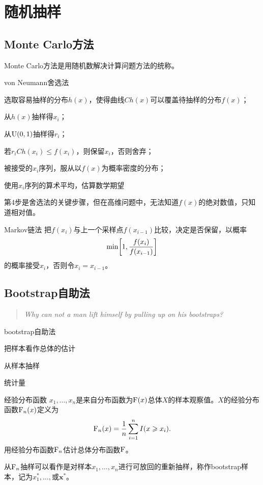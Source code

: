 \chapter{随机抽样}
\section{Monte Carlo方法}
Monte Carlo方法是用随机数解决计算问题方法的统称。
\begin{theorem}{von Neumann舍选法}{}
	\begin{compactenum}
		\item 选取容易抽样的分布$h(x)$，使得曲线$Ch(x)$可以覆盖待抽样的分布$f(x)$；
		\item 从$h(x)$抽样得$x_i$；
		\item 从$\operatorname{U}(0,1)$抽样得$r_i$；
		\item 若$r_iCh(x_i)\leqslant f(x_i)$，则保留$x_i$，否则舍弃；
		\item 被接受的$x_i$序列，服从以$f(x)$为概率密度的分布；
		\item 使用$x_i$序列的算术平均，估算数学期望
	\end{compactenum}
\end{theorem}
第4步是舍选法的关键步骤，但在高维问题中，无法知道$f(x)$的绝对数值，只知道相对值。
\begin{theorem}{Markov链法}{}
	把$f(x_i)$与上一个采样点$f(x_{i-1})$比较，决定是否保留，以概率
	\[
		\min\biggl[1,\frac{f(x_i)}{f(x_{i-1})}\biggr]
	\]
	的概率接受$x_i$，否则令$x_i=x_{i-1}$。
\end{theorem}
\section{Bootstrap自助法}
\begin{quote}
	\textit{Why can not a man lift himself by pulling up on his bootstraps?}
\end{quote}
\begin{method}{bootstrap自助法}{}
	\begin{compactenum}
		\item 把样本看作总体的估计
		\item 从样本抽样
		\item 统计量
	\end{compactenum}
\end{method}
\begin{definition}{经验分布函数}{}
	$x_1,\ldots,x_n$是来自分布函数为$\operatorname{F}(x)$总体$X$的样本观察值。$X$的经验分布函数$\operatorname{F}_n(x)$定义为
	\begin{align}
		\operatorname{F}_n(x)=\frac1n\sum_{i=1}^nI(x\geqslant x_i).
	\end{align}
	用经验分布函数$\operatorname{F}_n$估计总体分布函数$\operatorname{F}$。
\end{definition}
从$\operatorname{F}_n$抽样可以看作是对样本$x_1,\ldots,x_n$进行可放回的重新抽样，称作bootstrap样本，记为$x_1^\ast,\ldots,$或$\bm x^\ast$。

